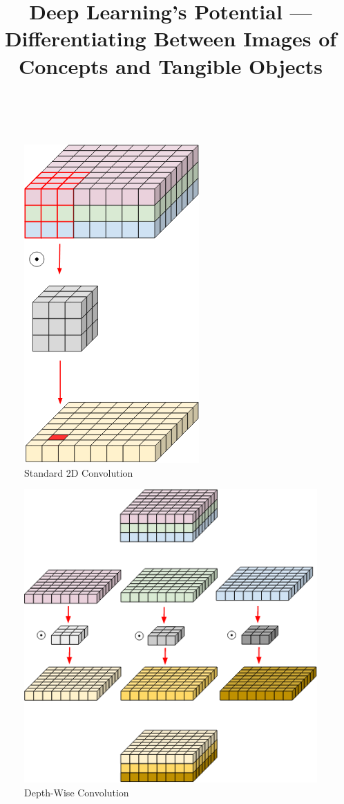 \documentclass[10pt, conference]{IEEEtran}
\title{Deep Learning’s Potential --- Differentiating Between Images of Concepts
and Tangible Objects}
\author{%
    \IEEEauthorblockN{Pratik Bhusal}
    \IEEEauthorblockA{%
        pratik.bhusal@utdallas.edu\\
        \today
    }\\

    \IEEEauthorblockN{Max Xie}
    \IEEEauthorblockA{%
        max.xie@utdallas.edu\\
        \today
    }
}
\begin{document}
\begin{figure}[H]
    \centering
    \includegraphics[height=50ex]{./figures/standardConvolution.png}
    \caption{Standard 2D Convolution~\cite{depthWiseConvolutionImages}}\label{fig:standard2DConvolution}
\end{figure}


\begin{figure}[H]
    \centering
    \includegraphics[height=50ex]{./figures/depthWiseConvolution.png}
    \caption{Depth-Wise Convolution~\cite{depthWiseConvolutionImages}}%
    \label{fig:depthWiseConvolution}
\end{figure}
\end{document}
